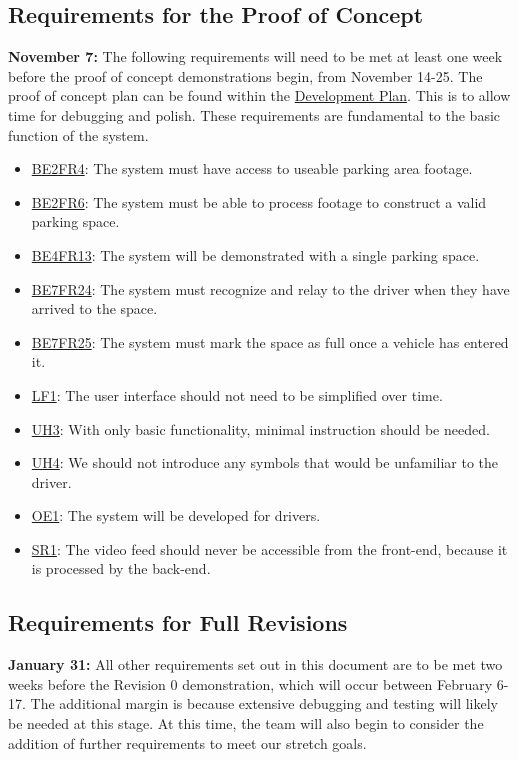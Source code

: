 \documentclass[12pt,letterpaper]{article}
\begin{document}
\subsection{Requirements for the Proof of Concept}
\textbf{November 7:} The following requirements will need to be met at least one
week before the proof of concept demonstrations begin, from November 14-25. The
proof of concept plan can be found within the
\href{https://github.com/parkd-app/park-d/blob/main/docs/DevelopmentPlan/DevelopmentPlan.pdf}
{Development Plan}. This is to allow time for debugging and polish. These
requirements are fundamental to the basic function of the system.
\begin{itemize}
    \item \hyperref[poc1]{BE2FR4}: The system must have access to useable
    parking area footage.
    \item \hyperref[poc2]{BE2FR6}: The system must be able to process footage to
    construct a valid parking space.
    \item \hyperref[poc3]{BE4FR13}: The system will be demonstrated with a
    single parking space.
    \item \hyperref[poc4]{BE7FR24}: The system must recognize and relay to the
    driver when they have arrived to the space.
    \item \hyperref[poc5]{BE7FR25}: The system must mark the space as full once
    a vehicle has entered it.
    \item \hyperref[pocnf1]{LF1}: The user interface should not need to be
    simplified over time.
    \item \hyperref[pocnf2]{UH3}: With only basic functionality, minimal
    instruction should be needed.
    \item \hyperref[pocnf3]{UH4}: We should not introduce any symbols that would
    be unfamiliar to the driver.
    \item \hyperref[pocnf4]{OE1}: The system will be developed for drivers.
    \item \hyperref[pocnf5]{SR1}: The video feed should never be accessible from
    the front-end, because it is processed by the back-end.
\end{itemize}

\subsection{Requirements for Full Revisions}
\textbf{January 31:} All other requirements set out in this document are to be
met two weeks before the Revision 0 demonstration, which will occur between
February 6-17. The additional margin is because extensive debugging and testing
will likely be needed at this stage. At this time, the team will also begin to
consider the addition of further requirements to meet our stretch goals.
\end{document}
